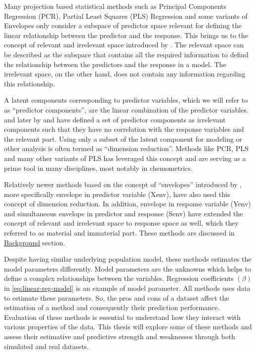 \documentclass[11pt,twoside,openright,titlepage,
  headinclude,footinclude,BCOR=5mm,
  numbers=noenddot,cleardoublepage=empty,
  tablecaptionabove, dottedtoc,
  bibliography=totoc,paper=a4]{scrreprt}
\begin{document}
Many projection based statistical methods such as Principal Components Regression (PCR), Partial Least Squares (PLS) Regression and some variants of Envelopes only consider a subspace of predictor space relevant for defining the linear relationship between the predictor and the response. This brings us to the concept of relevant and irrelevant space introduced by \citet{Naes1985}. The relevant space can be described as the subspace that contains all the required information to defind the relationship between the predictors and the response in a model. The irrelevant space, on the other hand, does not contain any information regarding this relationship.

A latent components corresponding to predictor variables, which we will refer to as ``predictor components'', are the linear combination of the predictor variables. \citet{Naes1985} and later by \citet{helland1990partial} and \citet{naes1993relevant} have defined a set of predictor components as irrelevant components such that they have no correlation with the response variables and the relevant part. Using only a subset of the latent component for modeling or other analysis is often termed as ``dimension reduction''. Methods like PCR, PLS and many other variants of PLS has leveraged this concept and are serving as a prime tool in many disciplines, most notably in chemometrics.

Relatively newer methods based on the concept of ``envelopes'' introduced by \citet{Cook2007a}, more specifically envelope in predictor variable (Xenv), have also used this concept of dimension reduction. In addition, envelope in response variable (Yenv) and simultaneous envelope in predictor and response (Senv) have extended the concept of relevant and irrelevant space to response space as well, which they referred to as material and immaterial part. These methods are discussed in \protect\hyperlink{background}{Background} section.

Despite having similar underlying population model, these methods estimates the model parameters differently. Model parameters are the unknowns which helps to define a complex relationships between the variables. Regression coefficients \((\beta)\) in \eqref{eq:linear-reg-model} is an example of model parameter. All methods uses data to estimate these parameters. So, the pros and cons of a dataset affect the estimation of a method and consequently their prediction performance. Evaluation of these methods is essential to understand how they interact with various properties of the data. This thesis will explore some of these methods and assess their estimative and predictive strength and weaknesses through both simulated and real datasets.
\end{document}
